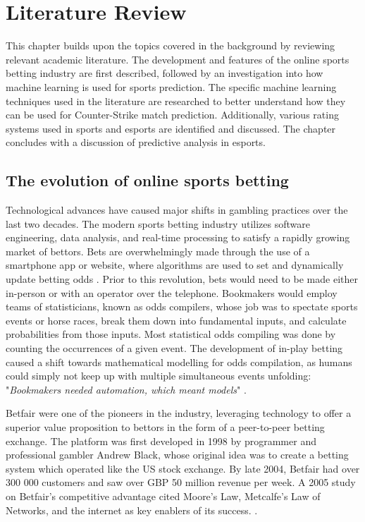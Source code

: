 \chapter{Literature Review}
\label{Literature Review}

This chapter builds upon the topics covered in the background by reviewing relevant academic literature. The development and features of the online sports betting industry are first described, followed by an investigation into how machine learning is used for sports prediction. The specific machine learning techniques used in the literature are researched to better understand how they can be used for Counter-Strike match prediction. Additionally, various rating systems used in sports and esports are identified and discussed. The chapter concludes with a discussion of predictive analysis in esports. 

\section{The evolution of online sports betting}

Technological advances have caused major shifts in gambling practices over the last two decades. The modern sports betting industry utilizes software engineering, data analysis, and real-time processing to satisfy a rapidly growing market of bettors. Bets are overwhelmingly made through the use of a smartphone app or website, where algorithms are used to set and dynamically update betting odds \cite{inplay}. Prior to this revolution, bets would need to be made either in-person or with an operator over the telephone. Bookmakers would employ teams of statisticians, known as odds compilers, whose job was to spectate sports events or horse races, break them down into fundamental inputs, and calculate probabilities from those inputs. Most statistical odds compiling was done by counting the occurrences of a given event. The development of in-play betting caused a shift towards mathematical modelling for odds compilation, as humans could simply not keep up with multiple simultaneous events unfolding: "\textit{Bookmakers needed automation, which meant models}" \cite{oddscompiler}.

Betfair were one of the pioneers in the industry, leveraging technology to offer a superior value proposition to bettors in the form of a peer-to-peer betting exchange. The platform was first developed in 1998 by programmer and professional gambler Andrew Black, whose original idea was to create a betting system which operated like the US stock exchange. By late 2004, Betfair had over 300 000 customers and saw over GBP 50 million revenue per week. A 2005 study on Betfair's competitive advantage cited Moore's Law, Metcalfe's Law of Networks, and the internet as key enablers of its success. \cite{betfair}.

